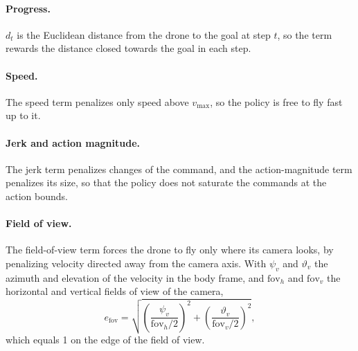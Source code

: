 \paragraph{Progress.} $d_t$ is the Euclidean distance from the drone to the goal at step $t$, so the term rewards the distance closed towards the goal in each step.

\paragraph{Speed.} The speed term penalizes only speed above $v_{\mathrm{max}}$, so the policy is free to fly fast up to it.

\paragraph{Jerk and action magnitude.} The jerk term penalizes changes of the command, and the action-magnitude term penalizes its size, so that the policy does not saturate the commands at the action bounds.

\paragraph{Field of view.} The field-of-view term forces the drone to fly only where its camera looks, by penalizing velocity directed away from the camera axis. With $\psi_v$ and $\vartheta_v$ the azimuth and elevation of the velocity in the body frame, and $\mathrm{fov}_h$ and $\mathrm{fov}_v$ the horizontal and vertical fields of view of the camera,
\begin{equation}
    e_{\mathrm{fov}} = \sqrt{\left(\frac{\psi_v}{\mathrm{fov}_h/2}\right)^2 + \left(\frac{\vartheta_v}{\mathrm{fov}_v/2}\right)^2},
    \label{eq:rfov}
\end{equation}
which equals 1 on the edge of the field of view.
